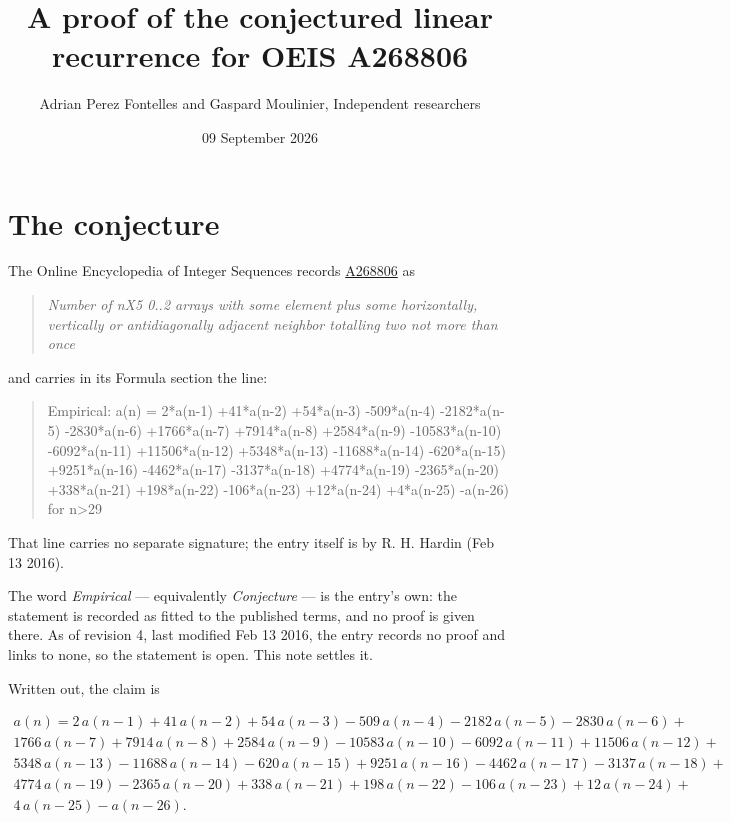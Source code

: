 \documentclass[11pt]{article}
\title{A proof of the conjectured linear recurrence for OEIS A268806}
\author{Adrian Perez Fontelles and Gaspard Moulinier, Independent researchers}
\date{09 September 2026}
\theoremstyle{definition}
\begin{document}
\maketitle
\section{The conjecture}

The Online Encyclopedia of Integer Sequences records \href{https://oeis.org/A268806}{A268806} as

\begin{quote}\itshape Number of nX5 0..2 arrays with some element plus some horizontally, vertically or antidiagonally adjacent neighbor totalling two not more than once\end{quote}

and carries in its Formula section the line:

\begin{quote}\ttfamily Empirical: a(n) = 2*a(n-1) +41*a(n-2) +54*a(n-3) -509*a(n-4) -2182*a(n-5) -2830*a(n-6) +1766*a(n-7) +7914*a(n-8) +2584*a(n-9) -10583*a(n-10) -6092*a(n-11) +11506*a(n-12) +5348*a(n-13) -11688*a(n-14) -620*a(n-15) +9251*a(n-16) -4462*a(n-17) -3137*a(n-18) +4774*a(n-19) -2365*a(n-20) +338*a(n-21) +198*a(n-22) -106*a(n-23) +12*a(n-24) +4*a(n-25) -a(n-26) for n>29\end{quote}

That line carries no separate signature; the entry itself is by R. H. Hardin (Feb 13 2016).

The word {\itshape Empirical} --- equivalently {\itshape Conjecture} --- is the entry's own: the statement is recorded as fitted to the published terms, and no proof is given there. As of revision 4, last modified Feb 13 2016, the entry records no proof and links to none, so the statement is open. This note settles it.

Written out, the claim is

\begin{multline*} a(n) = 2\,a(n-1) + 41\,a(n-2) + 54\,a(n-3) - 509\,a(n-4) - 2182\,a(n-5) - 2830\,a(n-6) + \\ 1766\,a(n-7) + 7914\,a(n-8) + 2584\,a(n-9) - 10583\,a(n-10) - 6092\,a(n-11) + 11506\,a(n-12) + \\ 5348\,a(n-13) - 11688\,a(n-14) - 620\,a(n-15) + 9251\,a(n-16) - 4462\,a(n-17) - 3137\,a(n-18) + \\ 4774\,a(n-19) - 2365\,a(n-20) + 338\,a(n-21) + 198\,a(n-22) - 106\,a(n-23) + 12\,a(n-24) + \\ 4\,a(n-25) - a(n-26). \end{multline*}
\end{document}
